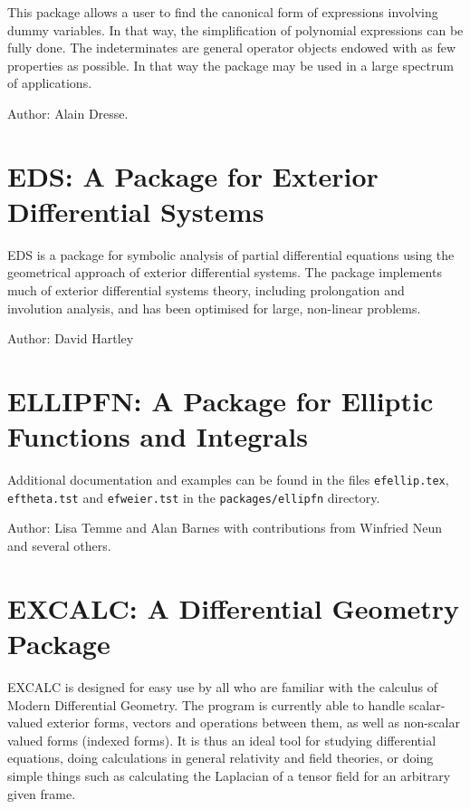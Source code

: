 This package allows a user to find the canonical form of expressions
involving dummy variables. In that way, the simplification of
polynomial expressions can be fully done. The indeterminates are general
operator objects endowed with as few properties as possible. In that way
the package may be used in a large spectrum of applications.

Author: Alain Dresse.



\newpage

\section{EDS: A Package for Exterior Differential Systems}

EDS is a \REDUCE package for symbolic analysis of partial differential
equations using the geometrical approach of exterior differential
systems. The package implements much of exterior differential systems
theory, including prolongation and involution analysis, and has been
optimised for large, non-linear problems.

Author: David Hartley



\newpage


\section{ELLIPFN: A Package for Elliptic Functions and Integrals}

Additional documentation and examples can
be found in the files \texttt{efellip.tex}, \texttt{eftheta.tst} and
\texttt{efweier.tst} in the \texttt{packages/ellipfn} directory.

Author:  Lisa Temme and Alan Barnes with contributions from Winfried Neun
and several others.



\newpage

\section{EXCALC: A Differential Geometry Package}
\label{package:EXCALC}

EXCALC is designed for easy use by all who are familiar with the calculus
of Modern Differential Geometry. The program is currently able to handle
scalar-valued exterior forms, vectors and operations between them, as well
as non-scalar valued forms (indexed forms). It is thus an ideal tool for
studying differential equations, doing calculations in general relativity
and field theories, or doing simple things such as calculating the
Laplacian of a tensor field for an arbitrary given frame.

